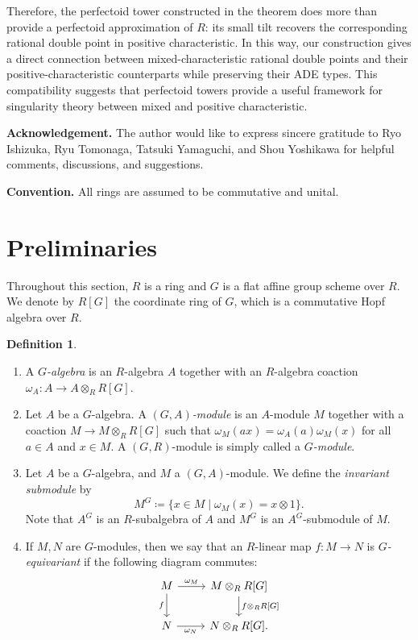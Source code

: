 \documentclass[uplatex,11pt,a4paper]{amsart} %
\numberwithin{equation}{section}
\numberwithin{figure}{section}
\numberwithin{table}{section}
\theoremstyle{plain}
\theoremstyle{definition}
\newtheorem{definition}[theorem]{Definition}
\begin{document}
Therefore, the perfectoid tower constructed in the theorem does more than provide a perfectoid approximation of $R$: its small tilt recovers the corresponding rational double point in positive characteristic. In this way, our construction gives a direct connection between mixed-characteristic rational double points and their positive-characteristic counterparts while preserving their ADE types. This compatibility suggests that perfectoid towers provide a useful framework for singularity theory between mixed and positive characteristic.

\medskip\noindent
\textbf{Acknowledgement.} %
The author would like to express sincere gratitude to Ryo Ishizuka, Ryu Tomonaga, Tatsuki Yamaguchi, and Shou Yoshikawa for helpful comments, discussions, and suggestions.

\medskip\noindent
\textbf{Convention.}
All rings are assumed to be commutative and unital.

\section{Preliminaries}

Throughout this section, $R$ is a ring and $G$ is a flat affine group scheme over $R$. We denote by $R[G]$ the coordinate ring of $G$, which is a commutative Hopf algebra over $R$.

\begin{definition}
  \begin{enumerate}
  \item A \emph{$G$-algebra} is an $R$-algebra $A$ together with an $R$-algebra coaction $\omega_A\colon A\to A\otimes_RR[G]$.
  \item Let $A$ be a $G$-algebra. A \emph{$(G,A)$-module} is an $A$-module $M$ together with a coaction $M\to M\otimes_RR[G]$ such that $\omega_M(ax)=\omega_A(a)\omega_M(x)$ for all $a\in A$ and $x\in M$. A $(G,R)$-module is simply called a \emph{$G$-module}.
  \item Let $A$ be a $G$-algebra, and $M$ a $(G,A)$-module. We define the \emph{invariant submodule} by
  \[
  M^G\coloneqq\{x\in M\mid \omega_M(x)=x\otimes 1\}.
  \]
  Note that $A^G$ is an $R$-subalgebra of $A$ and $M^G$ is an $A^G$-submodule of $M$.
  \item If $M,N$ are $G$-modules, then we say that an $R$-linear map $f\colon M\to N$ is \emph{$G$-equivariant} if the following diagram commutes:
  \[
  \begin{tikzcd}
  M \rar["\omega_M"] \dar["f"'] & {M\otimes_RR[G]} \dar["{f\otimes_RR[G]}"] \\
  N \rar["\omega_N"'] & {N\otimes_RR[G]}.
  \end{tikzcd}
  \]
  \end{enumerate}
\end{definition}
\end{document}
